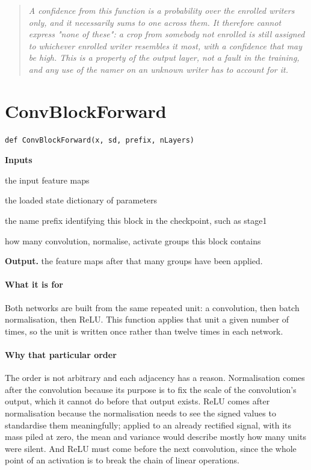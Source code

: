 \begin{quote}\small\itshape A confidence from this function is a probability over the enrolled writers only, and it necessarily sums to one across them. It therefore cannot express "none of these": a crop from somebody not enrolled is still assigned to whichever enrolled writer resembles it most, with a confidence that may be high. This is a property of the output layer, not a fault in the training, and any use of the namer on an unknown writer has to account for it.\end{quote}

\section{ConvBlockForward}
\begin{lstlisting}[style=sig]
def ConvBlockForward(x, sd, prefix, nLayers)
\end{lstlisting}

\noindent\textbf{Inputs}
\begin{description}[leftmargin=2.2em,style=nextline,font=\normalfont\ttfamily]\setlength\itemsep{1pt}
  \item[{x}] \normalfont the input feature maps
  \item[{sd}] \normalfont the loaded state dictionary of parameters
  \item[{prefix}] \normalfont the name prefix identifying this block in the checkpoint, such as stage1
  \item[{nLayers}] \normalfont how many convolution, normalise, activate groups this block contains
\end{description}

\noindent\textbf{Output.} the feature maps after that many groups have been applied.


\paragraph{What it is for}
Both networks are built from the same repeated unit: a convolution, then batch normalisation, then ReLU. This function applies that unit a given number of times, so the unit is written once rather than twelve times in each network.


\paragraph{Why that particular order}
The order is not arbitrary and each adjacency has a reason. Normalisation comes after the convolution because its purpose is to fix the scale of the convolution's output, which it cannot do before that output exists. ReLU comes after normalisation because the normalisation needs to see the signed values to standardise them meaningfully; applied to an already rectified signal, with its mass piled at zero, the mean and variance would describe mostly how many units were silent. And ReLU must come before the next convolution, since the whole point of an activation is to break the chain of linear operations.

